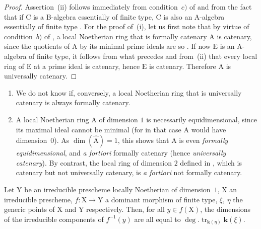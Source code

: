 \begin{proof}
Assertion~(ii) follows immediately from condition~$c)$ of  and from the fact that if $\mathrm{C}$ is a B-algebra essentially of finite type, $\mathrm{C}$ is also an A-algebra essentially of finite type .
For the proof of~(i), let us first note that by virtue of condition~$b)$ of , a local Noetherian ring that is formally catenary $\mathrm{A}$ is catenary, since the quotients of $\mathrm{A}$ by its minimal prime ideals are so .
If now $\mathrm{E}$ is an A-algebra of finite type, it follows from what precedes and from~(ii) that every local ring of $\mathrm{E}$ at a prime ideal is catenary, hence $\mathrm{E}$ is catenary.
Therefore $\mathrm{A}$ is universally catenary.
\end{proof}


\begin{remarks}[7.1.12]
\label{IV.7.1.12}
\begin{enumerate}[label=\emph{\roman*)}]
  \item We do not know if, conversely, a local Noetherian ring that is universally catenary is always formally catenary.

  \item A local Noetherian ring $\mathrm{A}$ of dimension $1$ is necessarily equidimensional, since its maximal ideal cannot be minimal (for in that case $\mathrm{A}$ would have dimension~$0$).
  As $\dim(\widehat{\mathrm{A}})=1$, this shows that $\mathrm{A}$ is even \emph{formally equidimensional}, and \emph{a fortiori} formally catenary (hence \emph{universally catenary}).
  By contrast, the local ring of dimension $2$ defined in , which is catenary but not universally catenary, is \emph{a fortiori} not formally catenary.
\end{enumerate}
\end{remarks}

\begin{corollary}[7.1.13]
\label{IV.7.1.13}
Let $\mathrm{Y}$ be an irreducible prescheme locally Noetherian of dimension~$1$, $\mathrm{X}$ an irreducible prescheme, $f:\mathrm{X}\to\mathrm{Y}$ a dominant morphism of finite type, $\xi$, $\eta$ the generic points of $\mathrm{X}$ and $\mathrm{Y}$ respectively.
Then, for all $y\in f(\mathrm{X})$, the dimensions of the irreducible components of $f^{-1}(y)$ are all equal to $\deg.\operatorname{tr}_{\boldsymbol{k}(\eta)}\boldsymbol{k}(\xi)$.
\end{corollary}

